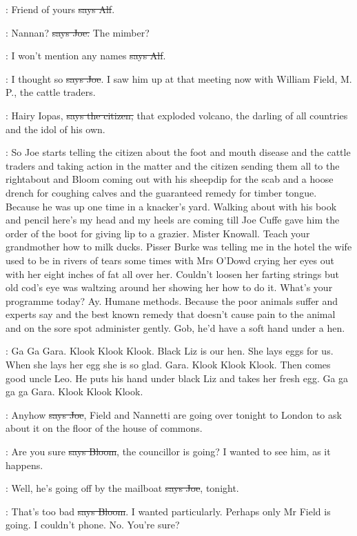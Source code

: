 \bergan:
Friend of yours \sout{says Alf}.

\joe:
Nannan? \sout{says Joe.} The mimber?

\bergan:
I won't mention any names \sout{says Alf}.

\joe:
I thought so \sout{says Joe}.
I saw him up at that meeting now with William
Field, M. P., the cattle traders.

\citizen:
Hairy Iopas, \sout{says the citizen,}
that exploded volcano, the darling of all
countries
and the idol of his own.

\Nq:
So Joe starts telling the citizen about the foot and mouth disease and
the cattle traders and taking action in the matter and the citizen sending
them all to the rightabout and Bloom coming out with his sheepdip for the
scab and a hoose drench for coughing calves and the guaranteed remedy
for timber tongue. Because he was up one time in a knacker's yard.
Walking about with his book and pencil here's my head and my heels are
coming till Joe Cuffe gave him the order of the boot for giving lip to a
grazier. Mister Knowall. Teach your grandmother how to milk ducks.
Pisser Burke was telling me in the hotel the wife used to be in rivers of
tears some times with Mrs O'Dowd crying her eyes out
with her eight inches
of fat all over her. Couldn't loosen her farting strings but old cod's eye
was waltzing around her showing her how to do it. What's your programme
today? Ay. Humane methods. Because the poor animals suffer and experts
say and the best known remedy that doesn't cause pain to the animal and
on the sore spot administer gently. Gob, he'd have a soft hand under a
hen.

:
Ga Ga Gara. Klook Klook Klook. Black Liz is our hen. She lays eggs
for us. When she lays her egg she is so glad. Gara. Klook Klook Klook.
Then comes good uncle Leo. He puts his hand under black Liz and takes
her fresh egg. Ga ga ga ga Gara. Klook Klook Klook.

\joe:
Anyhow \sout{says Joe},
Field and Nannetti are going over tonight to London
to ask about it on the floor of the house of commons.

\Bloom:
Are you sure \sout{says Bloom},
the councillor is going? I wanted to see him,
as it happens.

\joe:
Well, he's going off by the mailboat
\sout{says Joe}, tonight.

\Bloom:
That's too bad \sout{says Bloom}.
I wanted particularly. Perhaps only Mr Field
is going. I couldn't phone. No. You're sure?

